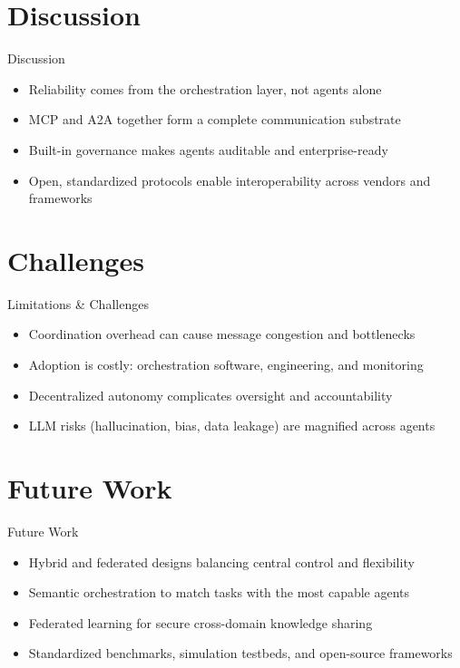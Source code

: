 \documentclass[10pt]{beamer}
\begin{document}
\section{Discussion}
\begin{frame}{Discussion}
\begin{itemize}
  \item Reliability comes from the orchestration layer, not agents alone
  \item MCP and A2A together form a complete communication substrate
  \item Built-in governance makes agents auditable and enterprise-ready
  \item Open, standardized protocols enable interoperability across vendors and frameworks
\end{itemize}
\end{frame}

\section{Challenges}
\begin{frame}{Limitations \& Challenges}
\begin{itemize}
  \item Coordination overhead can cause message congestion and bottlenecks
  \item Adoption is costly: orchestration software, engineering, and monitoring
  \item Decentralized autonomy complicates oversight and accountability
  \item LLM risks (hallucination, bias, data leakage) are magnified across agents
\end{itemize}
\end{frame}

\section{Future Work}
\begin{frame}{Future Work}
\begin{itemize}
  \item Hybrid and federated designs balancing central control and flexibility
  \item Semantic orchestration to match tasks with the most capable agents
  \item Federated learning for secure cross-domain knowledge sharing
  \item Standardized benchmarks, simulation testbeds, and open-source frameworks
\end{itemize}
\end{frame}
\end{document}
